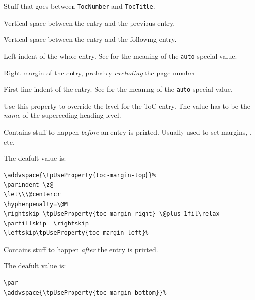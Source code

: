 Stuff that goes between \texttt{TocNumber} and \texttt{TocTitle}.


Vertical space between the entry and the previous entry.


Vertical space between the entry and the following entry.


Left indent of the whole entry. See  for the
meaning of the \texttt{auto} special value.


Right margin of the entry, probably \textit{excluding} the page number.


First line indent of the entry. See  for the
meaning of the \texttt{auto} special value.



Use this property to override the level for the ToC entry. The value has to
be the \textit{name} of the superceding heading level.



Contains stuff to happen \textit{before} an entry is printed. Usually
used to set margins, \texttt{\string\parindent}, etc.

The deafult value is:
\begin{lstlisting}[style=tex]
\addvspace{\tpUseProperty{toc-margin-top}}%
\parindent \z@
\let\\\@centercr
\hyphenpenalty=\@M
\rightskip \tpUseProperty{toc-margin-right} \@plus 1fil\relax
\parfillskip -\rightskip
\leftskip\tpUseProperty{toc-margin-left}%
\end{lstlisting}



Contains stuff to happen \textit{after} the entry is printed.

The deafult value is:
\begin{lstlisting}[style=tex]
\par
\addvspace{\tpUseProperty{toc-margin-bottom}}%
\end{lstlisting}


